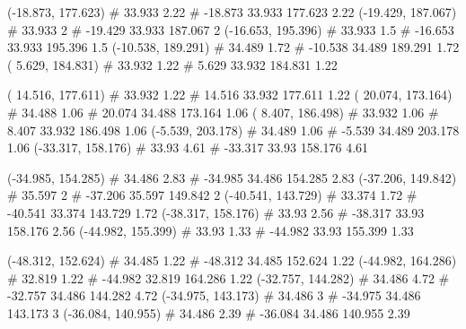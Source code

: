 \documentclass[a4paper,openbib,10pt]{article}
\newenvironment{treegraph}{\begin{graph}}{\end{graph}}
\begin{document}
\begin{treegraph}
  (-18.873, 177.623) #     33.933    2.22
   #    -18.873    33.933    177.623    2.22
  (-19.429, 187.067) #     33.933    2
   #    -19.429    33.933    187.067    2
  (-16.653, 195.396) #     33.933    1.5
   #    -16.653    33.933    195.396    1.5
  (-10.538, 189.291) #     34.489    1.72
   #    -10.538    34.489    189.291    1.72
  ( 5.629, 184.831) #     33.932    1.22
   #    5.629    33.932    184.831    1.22

  ( 14.516, 177.611) #     33.932    1.22
   #    14.516    33.932    177.611    1.22
  ( 20.074, 173.164) #     34.488    1.06
   #    20.074    34.488    173.164    1.06
  ( 8.407, 186.498) #     33.932    1.06
   #    8.407    33.932    186.498    1.06
  (-5.539, 203.178) #     34.489    1.06
   #    -5.539    34.489    203.178    1.06
  (-33.317, 158.176) #     33.93    4.61
   #    -33.317    33.93    158.176    4.61

  (-34.985, 154.285) #     34.486    2.83
   #    -34.985    34.486    154.285    2.83
  (-37.206, 149.842) #     35.597    2
   #    -37.206    35.597    149.842    2
  (-40.541, 143.729) #     33.374    1.72
   #    -40.541    33.374    143.729    1.72
  (-38.317, 158.176) #     33.93    2.56
   #    -38.317    33.93    158.176    2.56
  (-44.982, 155.399) #     33.93    1.33
   #    -44.982    33.93    155.399    1.33

  (-48.312, 152.624) #     34.485    1.22
   #    -48.312    34.485    152.624    1.22
  (-44.982, 164.286) #     32.819    1.22
   #    -44.982    32.819    164.286    1.22
  (-32.757, 144.282) #     34.486    4.72
   #    -32.757    34.486    144.282    4.72
  (-34.975, 143.173) #     34.486    3
   #    -34.975    34.486    143.173    3
  (-36.084, 140.955) #     34.486    2.39
   #    -36.084    34.486    140.955    2.39


\end{treegraph}
\end{document}

